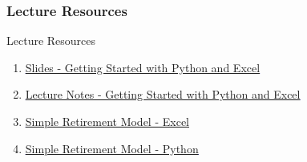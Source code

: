 \documentclass[handout, 11pt]{beamer}
\begin{document}
\appendix
{}
\setcounter{finalframe}{\value{framenumber}}
\begin{frame}
\frametitle{Lecture Resources}
{
\begin{block}{Lecture Resources}
\begin{enumerate}
\item \textcolor{blue}{\underline{\href{https://nickderobertis.github.io/fin-model-course/\_static/generated/pdfs/S2 Getting Started with Python and Excel.pdf}{Slides - Getting Started with Python and Excel}}}
\item \textcolor{blue}{\underline{\href{https://nickderobertis.github.io/fin-model-course/\_static/generated/pdfs/LN2 Getting Started with Python and Excel.pdf}{Lecture Notes - Getting Started with Python and Excel}}}
\item \textcolor{blue}{\underline{\href{https://nickderobertis.github.io/fin-model-course/\_static/Examples/Introduction/Excel/Simple Retirement Model.xlsx}{Simple Retirement Model - Excel}}}
\item \textcolor{blue}{\underline{\href{https://nickderobertis.github.io/fin-model-course/\_static/Examples/Introduction/Python/Simple Retirement Model.ipynb}{Simple Retirement Model - Python}}}
\end{enumerate}
\vfill
\end{block}
}
\label{frames:resources}
\end{frame}
\small
\end{document}
